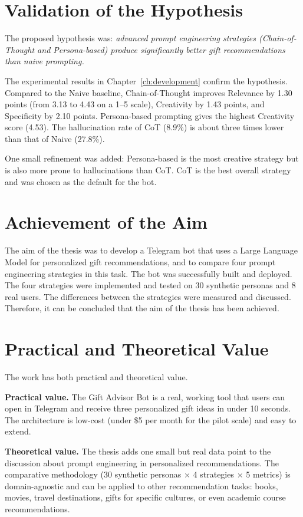 \section*{Validation of the Hypothesis}

The proposed hypothesis was: \textit{advanced prompt engineering strategies (Chain-of-Thought and Persona-based) produce significantly better gift recommendations than naive prompting.}

The experimental results in Chapter~\ref{ch:development} confirm the hypothesis. Compared to the Naive baseline, Chain-of-Thought improves Relevance by 1.30 points (from 3.13 to 4.43 on a 1--5 scale), Creativity by 1.43 points, and Specificity by 2.10 points. Persona-based prompting gives the highest Creativity score (4.53). The hallucination rate of CoT (8.9\%) is about three times lower than that of Naive (27.8\%).

One small refinement was added: Persona-based is the most creative strategy but is also more prone to hallucinations than CoT. CoT is the best overall strategy and was chosen as the default for the bot.

\section*{Achievement of the Aim}

The aim of the thesis was to develop a Telegram bot that uses a Large Language Model for personalized gift recommendations, and to compare four prompt engineering strategies in this task. The bot was successfully built and deployed. The four strategies were implemented and tested on 30 synthetic personas and 8 real users. The differences between the strategies were measured and discussed. Therefore, it can be concluded that the aim of the thesis has been achieved.

\section*{Practical and Theoretical Value}

The work has both practical and theoretical value.

\textbf{Practical value.} The Gift Advisor Bot is a real, working tool that users can open in Telegram and receive three personalized gift ideas in under 10 seconds. The architecture is low-cost (under \$5 per month for the pilot scale) and easy to extend.

\textbf{Theoretical value.} The thesis adds one small but real data point to the discussion about prompt engineering in personalized recommendations. The comparative methodology (30 synthetic personas $\times$ 4 strategies $\times$ 5 metrics) is domain-agnostic and can be applied to other recommendation tasks: books, movies, travel destinations, gifts for specific cultures, or even academic course recommendations.

